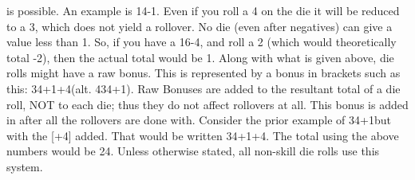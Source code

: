 \documentclass[twoside]{book}
\begin{document}
               is possible. An example is 14-1. Even if you roll a 4 on
               the die it will be reduced to a 3, which does not yield a
               rollover. No die (even after negatives) can give a value
               less than 1. So, if you have a 16-4, and roll a 2 (which
               would theoretically total -2), then the actual total would
               be 1.  Along with what is given above, die rolls might have
               a raw bonus. This is represented by a bonus in brackets
               such as this: 34+1+4(alt. 434+1). Raw Bonuses are
               added to the resultant total of a die roll, NOT to each
               die; thus they do not affect rollovers at all. This bonus
               is added in after all the rollovers are done with.
               Consider the prior example of 34+1but with the [+4]
               added. That would be written 34+1+4. The total using
               the above numbers would be 24.  Unless otherwise stated, all non-skill die rolls use
               this system. 
\end{document}
